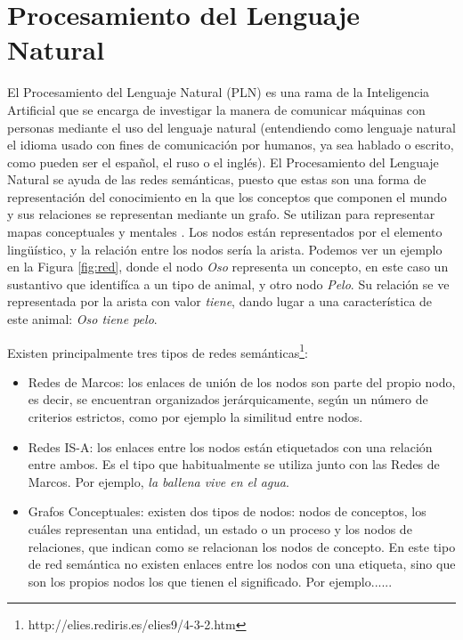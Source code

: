 \section{Procesamiento del Lenguaje Natural}
\label{cap:sec:lenguajenatural}
El Procesamiento del Lenguaje Natural (PLN) es una rama de la Inteligencia Artificial que se encarga de investigar la manera de comunicar máquinas con personas mediante el uso del lenguaje natural (entendiendo como lenguaje natural el idioma usado con fines de comunicación por humanos, ya sea hablado o escrito, como pueden ser el español, el ruso o el inglés). 
El Procesamiento del Lenguaje Natural se ayuda de las redes semánticas, puesto que estas son una forma de representación del conocimiento en la que los conceptos que componen el mundo y sus relaciones se representan mediante un grafo. Se utilizan para representar mapas conceptuales y mentales \citep{wiki:redSemantica2018}.
Los nodos están representados por el elemento lingüístico, y la relación entre los nodos sería la arista. Podemos ver un ejemplo en la Figura \ref{fig:red}, donde el nodo \textit{Oso} representa un concepto, en este caso un sustantivo que identifíca a un tipo de animal,  y otro nodo \textit{Pelo}. Su relación se ve representada por la arista con valor \textit{tiene}, dando lugar a una característica de este animal: \textit{Oso tiene pelo}.
 
Existen principalmente tres tipos de redes semánticas\footnote{http://elies.rediris.es/elies9/4-3-2.htm}:
\begin{itemize}
	\item Redes de Marcos: los enlaces de unión de los nodos son parte del propio nodo, es decir, se encuentran organizados jerárquicamente, según un número de criterios estrictos, como por ejemplo la similitud entre nodos.
	\item Redes IS-A: los enlaces entre los nodos están etiquetados con una relación entre ambos. Es el tipo que habitualmente se utiliza junto con las Redes de Marcos. Por ejemplo, \textit{la ballena vive en el agua}. 
	\item Grafos Conceptuales: existen dos tipos de nodos: nodos de conceptos, los cuáles representan una entidad, un estado o un proceso y los nodos de relaciones, que indican como se relacionan los nodos de concepto. En este tipo de red semántica no existen enlaces entre los nodos con una etiqueta, sino que son los propios nodos los que tienen el significado. Por ejemplo......
\end{itemize}

